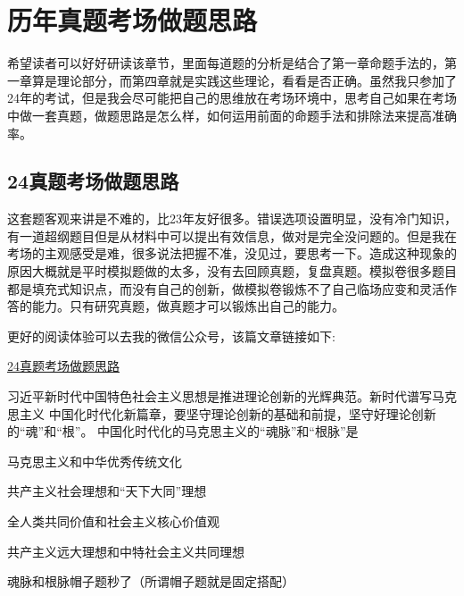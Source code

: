 \documentclass[lang=cn,blue,10pt,scheme=chinese,twocol]{zznote}
\begin{document}
\chapter{历年真题考场做题思路}
希望读者可以好好研读该章节，里面每道题的分析是结合了第一章命题手法的，第一章算是理论部分，而第四章就是实践这些理论，看看是否正确。虽然我只参加了24年的考试，但是我会尽可能把自己的思维放在考场环境中，思考自己如果在考场中做一套真题，做题思路是怎么样，如何运用前面的命题手法和排除法来提高准确率。
\section{24真题考场做题思路}
\begin{conclusion}
	这套题客观来讲是不难的，比23年友好很多。错误选项设置明显，没有冷门知识，有一道超纲题目但是从材料中可以提出有效信息，做对是完全没问题的。但是我在考场的主观感受是难，很多说法把握不准，没见过，要思考一下。造成这种现象的原因大概就是平时模拟题做的太多，没有去回顾真题，复盘真题。模拟卷很多题目都是填充式知识点，而没有自己的创新，做模拟卷锻炼不了自己临场应变和灵活作答的能力。只有研究真题，做真题才可以锻炼出自己的能力。
\end{conclusion}
更好的阅读体验可以去我的微信公众号，该篇文章链接如下:

\href{https://mp.weixin.qq.com/s/Y1YAdhgg9kceCpxVkEPnhQ}{24真题考场做题思路}

\begin{exercise}习近平新时代中国特色社会主义思想是推进理论创新的光辉典范。新时代谱写马克思主义 中国化时代化新篇章，要坚守理论创新的基础和前提，坚守好理论创新的“魂”和“根”。 中国化时代化的马克思主义的“魂脉”和“根脉”是
	\begin{choice}
		\item 马克思主义和中华优秀传统文化
		\item 共产主义社会理想和“天下大同”理想
		\item 全人类共同价值和社会主义核心价值观
		\item 共产主义远大理想和中特社会主义共同理想
	\end{choice}
\end{exercise}
\begin{solution}
	魂脉和根脉帽子题秒了（所谓帽子题就是固定搭配）
\end{solution}
\end{document}
